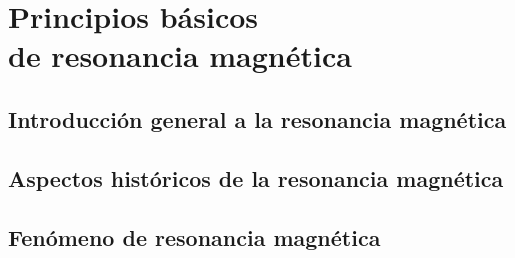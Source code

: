 \documentclass[]{memoir}          %
\begin{document}
\titleTH
\newpage

\frontmatter
\tableofcontents













\mainmatter
\pagestyle{companion}


\part{Principios básicos\\de resonancia magnética}
\label{part_principiosBasicos}


\chapter{Introducción general a la resonancia magnética}
\label{chapter_introGeneral}



\chapter{Aspectos históricos de la resonancia magnética}
\label{chapter_historia}



\chapter{Fenómeno de resonancia magnética}
\label{chapter_fenomeno}

\end{document}
